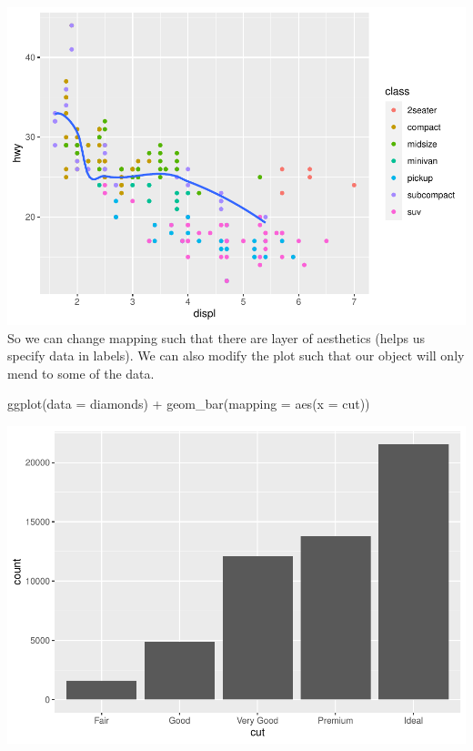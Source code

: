 \documentclass[
]{article}
\newenvironment{Shaded}{\begin{snugshade}}{\end{snugshade}}
\newcommand{\AttributeTok}[1]{\textcolor[rgb]{0.77,0.63,0.00}{#1}}
\newcommand{\FunctionTok}[1]{\textcolor[rgb]{0.00,0.00,0.00}{#1}}
\newcommand{\NormalTok}[1]{#1}
\newcommand{\SpecialCharTok}[1]{\textcolor[rgb]{0.00,0.00,0.00}{#1}}
\begin{document}
\includegraphics{Journal_files/figure-latex/unnamed-chunk-43-4.pdf} So
we can change mapping such that there are layer of aesthetics (helps us
specify data in labels). We can also modify the plot such that our
object will only mend to some of the data.

\begin{Shaded}
\begin{Highlighting}[]
\FunctionTok{ggplot}\NormalTok{(}\AttributeTok{data =}\NormalTok{ diamonds) }\SpecialCharTok{+} 
  \FunctionTok{geom\_bar}\NormalTok{(}\AttributeTok{mapping =} \FunctionTok{aes}\NormalTok{(}\AttributeTok{x =}\NormalTok{ cut))}
\end{Highlighting}
\end{Shaded}

\includegraphics{Journal_files/figure-latex/unnamed-chunk-44-1.pdf}
\end{document}
